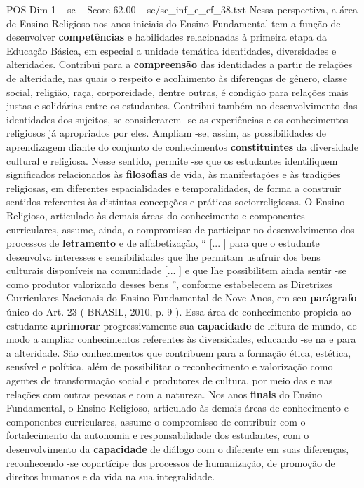 \begin{textsample}{POS Dim 1 – sc – Score 62.00 – sc/sc\_inf\_e\_ef\_38.txt}
Nessa perspectiva, a área de Ensino Religioso nos anos iniciais do Ensino Fundamental tem a função de desenvolver \textbf{competências} e habilidades relacionadas à primeira etapa da Educação Básica, em especial a unidade temática identidades, diversidades e alteridades.
Contribui para a \textbf{compreensão} das identidades a partir de relações de alteridade, nas quais o respeito e acolhimento às diferenças de gênero, classe social, religião, raça, corporeidade, dentre outras, é condição para relações mais justas e solidárias entre os estudantes.
Contribui também no desenvolvimento das identidades dos sujeitos, se considerarem -se as experiências e os conhecimentos religiosos já apropriados por eles.
Ampliam -se, assim, as possibilidades de aprendizagem diante do conjunto de conhecimentos \textbf{constituintes} da diversidade cultural e religiosa.
Nesse sentido, permite -se que os estudantes identifiquem significados relacionados às \textbf{filosofias} de vida, às manifestações e às tradições religiosas, em diferentes espacialidades e temporalidades, de forma a construir sentidos referentes às distintas concepções e práticas sociorreligiosas.
O Ensino Religioso, articulado às demais áreas do conhecimento e componentes curriculares, assume, ainda, o compromisso de participar no desenvolvimento dos processos de \textbf{letramento} e de alfabetização, “ [... ] para que o estudante desenvolva interesses e sensibilidades que lhe permitam usufruir dos bens culturais disponíveis na comunidade [... ] e que lhe possibilitem ainda sentir -se como produtor valorizado desses bens ”, conforme estabelecem as Diretrizes Curriculares Nacionais do Ensino Fundamental de Nove Anos, em seu \textbf{parágrafo} único do Art. 23 ( BRASIL, 2010, p. 9 ).
Essa área de conhecimento propicia ao estudante \textbf{aprimorar} progressivamente sua \textbf{capacidade} de leitura de mundo, de modo a ampliar conhecimentos referentes às diversidades, educando -se na e para a alteridade.
São conhecimentos que contribuem para a formação ética, estética, sensível e política, além de possibilitar o reconhecimento e valorização como agentes de transformação social e produtores de cultura, por meio das e nas relações com outras pessoas e com a natureza.
Nos anos \textbf{finais} do Ensino Fundamental, o Ensino Religioso, articulado às demais áreas de conhecimento e componentes curriculares, assume o compromisso de contribuir com o fortalecimento da autonomia e responsabilidade dos estudantes, com o desenvolvimento da \textbf{capacidade} de diálogo com o diferente em suas diferenças, reconhecendo -se copartícipe dos processos de humanização, de promoção de direitos humanos e da vida na sua integralidade.

\end{textsample}
